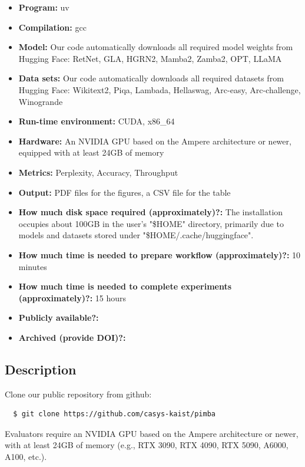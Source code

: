 \begin{itemize}[leftmargin=*]
  \item \textbf{Program:} uv
  \item \textbf{Compilation:} gcc
  \item \textbf{Model:} Our code automatically downloads all required
    model weights from Hugging Face: RetNet, GLA, HGRN2, Mamba2,
    Zamba2, OPT, LLaMA
  \item \textbf{Data sets:} Our code automatically downloads all required
    datasets from Hugging Face: Wikitext2, Piqa, Lambada,
    Hellaswag, Arc-easy, Arc-challenge, Winogrande
  \item \textbf{Run-time environment:} CUDA, x86\_64
  \item \textbf{Hardware:} An NVIDIA GPU based on the Ampere
    architecture or newer, equipped with at least 24GB of memory
  \item \textbf{Metrics:} Perplexity, Accuracy, Throughput
  \item \textbf{Output:} PDF files for the figures, a CSV file for the table
  \item \textbf{How much disk space required (approximately)?:} The
    installation occupies about 100GB in the user's "\$HOME" directory,
    primarily due to models and datasets stored under
    "\$HOME/.cache/huggingface".
  \item \textbf{How much time is needed to prepare workflow
    (approximately)?:} 10 minutes
  \item \textbf{How much time is needed to complete experiments
    (approximately)?:} 15 hours
  \item \textbf{Publicly available?:}
  \item \textbf{Archived (provide DOI)?:}
\end{itemize}

\subsection{Description}
%
%
Clone our public repository from github:
%
\begin{verbatim}
  $ git clone https://github.com/casys-kaist/pimba
\end{verbatim}
%

%
%
Evaluators require an NVIDIA GPU based on
the Ampere architecture or newer, with at least 24GB of memory
(e.g., RTX 3090, RTX 4090, RTX 5090, A6000, A100, etc.).
%

